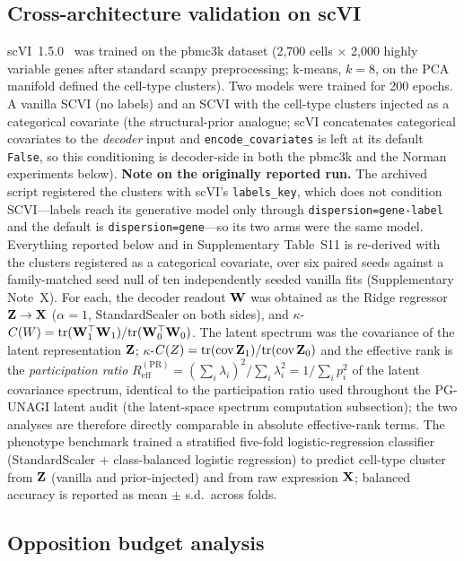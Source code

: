 \subsection*{Cross-architecture validation on scVI}
\label{sec:methods_scvi}
scVI~1.5.0~\cite{lopez2018} was trained on the pbmc3k dataset (2,700 cells $\times$ 2,000 highly variable genes after standard scanpy preprocessing; k-means, $k=8$, on the PCA manifold defined the cell-type clusters). Two models were trained for 200 epochs. A vanilla SCVI (no labels) and an SCVI with the cell-type clusters injected as a categorical covariate (the structural-prior analogue; scVI concatenates categorical covariates to the \emph{decoder} input and \texttt{encode\_covariates} is left at its default \texttt{False}, so this conditioning is decoder-side in both the pbmc3k and the Norman experiments below). \textbf{Note on the originally reported run.} The archived script registered the clusters with scVI's \texttt{labels\_key}, which does not condition SCVI---labels reach its generative model only through \texttt{dispersion=gene-label} and the default is \texttt{dispersion=gene}---so its two arms were the same model. Everything reported below and in Supplementary Table~S11 is re-derived with the clusters registered as a categorical covariate, over six paired seeds against a family-matched seed null of ten independently seeded vanilla fits (Supplementary Note~X). For each, the decoder readout $\mathbf{W}$ was obtained as the Ridge regressor $\mathbf{Z}\to\mathbf{X}$ ($\alpha=1$, StandardScaler on both sides), and $\kappa$-$C(W)=\mathrm{tr}(\mathbf{W}_1^\top\mathbf{W}_1)/\mathrm{tr}(\mathbf{W}_0^\top\mathbf{W}_0)$. The latent spectrum was the covariance of the latent representation $\mathbf{Z}$; $\kappa$-$C(Z)=\mathrm{tr}(\mathrm{cov}\,\mathbf{Z}_1)/\mathrm{tr}(\mathrm{cov}\,\mathbf{Z}_0)$ and the effective rank is the \emph{participation ratio} $R_{\mathrm{eff}}^{(\mathrm{PR})}=(\sum_i\lambda_i)^2/\sum_i\lambda_i^2=1/\sum_i p_i^2$ of the latent covariance spectrum, identical to the participation ratio used throughout the PG-UNAGI latent audit (the latent-space spectrum computation subsection); the two analyses are therefore directly comparable in absolute effective-rank terms. The phenotype benchmark trained a stratified five-fold logistic-regression classifier (StandardScaler + class-balanced logistic regression) to predict cell-type cluster from $\mathbf{Z}$ (vanilla and prior-injected) and from raw expression $\mathbf{X}$; balanced accuracy is reported as mean $\pm$ s.d.\ across folds.

\subsection*{Opposition budget analysis}

